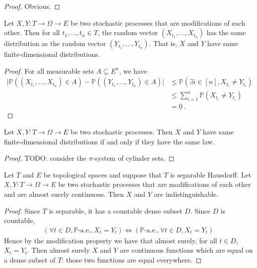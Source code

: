 \begin{proof}
Obvious.
\end{proof}


\begin{lemma}\label{lem:map_eq_of_modification}
Let $X, Y : T \to \Omega \to E$ be two stochastic processes that are modifications of each other.
Then for all $t_1, \ldots, t_n \in T$, the random vector $(X_{t_1}, \ldots, X_{t_n})$ has the same distribution as the random vector $(Y_{t_1}, \ldots, Y_{t_n})$.
That is, $X$ and $Y$ have same finite-dimensional distributions.
\end{lemma}

\begin{proof}
For all measurable sets $A \subseteq E^n$, we have
\begin{align*}
  \vert \mathbb{P}((X_{t_1}, \ldots, X_{t_n}) \in A) - \mathbb{P}((Y_{t_1}, \ldots, Y_{t_n}) \in A) \vert
  &\le \mathbb{P}(\exists i \in [n], X_{t_i} \ne Y_{t_i})
  \\
  &\le \sum_{i=1}^n \mathbb{P}(X_{t_i} \ne Y_{t_i})
  \\
  &= 0
  \: .
\end{align*}
\end{proof}


\begin{lemma}\label{lem:map_eq_iff}
Let $X, Y : T \to \Omega \to E$ be two stochastic processes.
Then $X$ and $Y$ have same finite-dimensional distributions if and only if they have the same law.
\end{lemma}

\begin{proof}
TODO: consider the $\pi$-system of cylinder sets.
\end{proof}


\begin{lemma}\label{lem:indistinguishable_of_modification_of_continuous}
Let $T$ and $E$ be topological spaces and suppose that $T$ is separable Hausdorff.
Let $X, Y : T \to \Omega \to E$ be two stochastic processes that are modifications of each other and are almost surely continuous.
Then $X$ and $Y$ are indistinguishable.
\end{lemma}

\begin{proof}
Since $T$ is separable, it has a countable dense subset $D$.
Since $D$ is countable,
\begin{align*}
  (\forall t \in D, \mathbb{P}\text{-a.e.}, X_t = Y_t)
  \iff (\mathbb{P}\text{-a.e.}, \forall t \in D, X_t = Y_t)
\end{align*}
Hence by the modification property we have that almost surely, for all $t \in D$, $X_t = Y_t$.
Then almost surely $X$ and $Y$ are continuous functions which are equal on a dense subset of $T$: those two functions are equal everywhere.
\end{proof}
